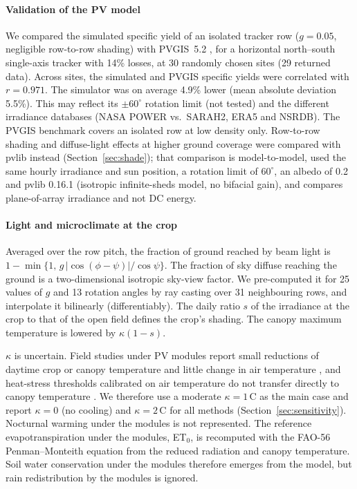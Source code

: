 \paragraph{Validation of the PV model}
We compared the simulated specific yield of an isolated tracker row ($g=0.05$, negligible row-to-row shading) with PVGIS~5.2 \citep{pvgis}, for a horizontal north--south single-axis tracker with 14\% losses, at 30 randomly chosen sites (29 returned data). Across sites, the simulated and PVGIS specific yields were correlated with $r=0.971$. The simulator was on average 4.9\% lower (mean absolute deviation 5.5\%). This may reflect its $\pm60^\circ$ rotation limit (not tested) and the different irradiance databases (NASA POWER vs.\ SARAH2, ERA5 and NSRDB). The PVGIS benchmark covers an isolated row at low density only. Row-to-row shading and diffuse-light effects at higher ground coverage were compared with pvlib instead (Section~\ref{sec:shade}); that comparison is model-to-model, used the same hourly irradiance and sun position, a rotation limit of $60^\circ$, an albedo of 0.2 and pvlib 0.16.1 (isotropic infinite-sheds model, no bifacial gain), and compares plane-of-array irradiance and not DC energy.

\paragraph{Light and microclimate at the crop}
Averaged over the row pitch, the fraction of ground reached by beam light is $1-\min\{1,\,g\,|\cos(\phi-\psi)|/\cos\psi\}$. The fraction of sky diffuse reaching the ground is a two-dimensional isotropic sky-view factor. We pre-computed it for 25 values of $g$ and 13 rotation angles by ray casting over 31 neighbouring rows, and interpolate it bilinearly (differentiably). The daily ratio $s$ of the irradiance at the crop to that of the open field defines the crop's shading. The canopy maximum temperature is lowered by $\kappa(1-s)$.

$\kappa$ is uncertain. Field studies under PV modules report small reductions of daytime crop or canopy temperature and little change in air temperature \citep{marrou2013,barron2019}, and heat-stress thresholds calibrated on air temperature do not transfer directly to canopy temperature \citep{siebert2014,webber2018}. We therefore use a moderate $\kappa=1$\,\textdegree C as the main case and report $\kappa=0$ (no cooling) and $\kappa=2$\,\textdegree C for all methods (Section~\ref{sec:sensitivity}). Nocturnal warming under the modules is not represented. The reference evapotranspiration under the modules, ET$_0$, is recomputed with the FAO-56 Penman--Monteith equation \citep{allen1998} from the reduced radiation and canopy temperature. Soil water conservation under the modules \citep{adeh2018,elamri2018} therefore emerges from the model, but rain redistribution by the modules \citep{marrou2013water} is ignored.

